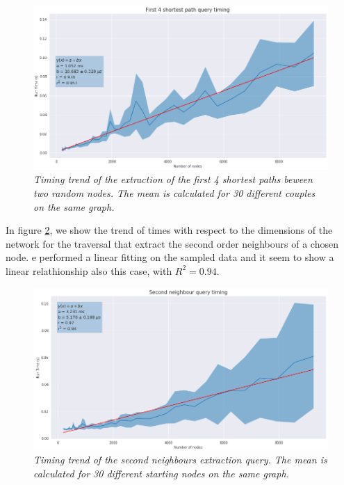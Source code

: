 \documentclass[11pt,twocolumn]{article}
\begin{document}
\begin{figure}[ht!]
  \includegraphics[width=\linewidth]{images/4_shortest_path_timing.png}
  \caption{\small{\textit{Timing trend of the extraction of the first 4 shortest paths beween two random nodes. The mean is calculated for 30 different couples on the same graph.}}}
  \label{fig:1}
\end{figure}

In figure \ref{fig:2}, we show the trend of times with respect to the dimensions of the network for the traversal that extract the second order neighbours of a chosen node. e performed a linear fitting on the sampled data and it seem to show a linear relathionship also this case, with $R^2 = 0.94$.

\begin{figure}[ht!]
   \includegraphics[width=\linewidth]{images/traverse_0_2.png}
   \caption{\small{\textit{Timing trend of the second neighbours extraction query. The mean is calculated for 30 different starting nodes on the same graph.}}}
   \label{fig:2}
\end{figure}

\newpage
\end{document}
